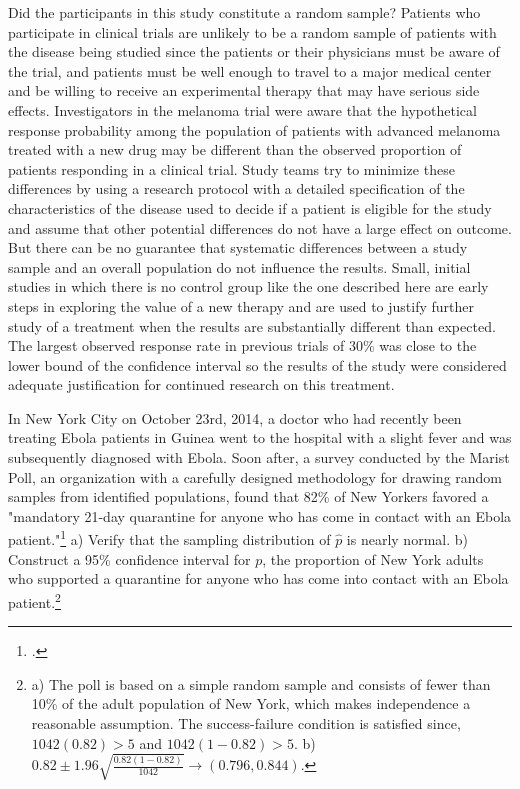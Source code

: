 Did the participants in this study constitute a random sample?  Patients who participate in clinical trials are unlikely to be a random sample of patients with the disease being studied since the patients or their physicians must be aware of the trial, and patients must be well enough to travel to a major medical center and be willing to receive an experimental therapy that may have serious side effects.  Investigators in the melanoma trial were aware that the hypothetical response probability among the population of patients with advanced melanoma treated with a new drug may be different than the observed proportion of patients responding in a clinical trial.  Study teams try to minimize these differences by using a research protocol with a detailed specification of the characteristics of the disease used to decide if a patient is eligible for the study and assume that other potential differences do not have a large effect on outcome.  But there can be no guarantee that systematic differences between a study sample and an overall population do not influence the results.  Small, initial studies in which there is no control group like the one described here are early steps in exploring the value of a new therapy and are used to justify further study of a treatment when the results are substantially different than expected.  The largest observed response rate in previous trials of 30\% was close to the lower bound of the confidence interval so the results of the study were considered adequate justification for continued research on this treatment.


\begin{exercise}
In New York City on October 23rd, 2014, a doctor who had recently been treating Ebola patients in Guinea went to the hospital with a slight fever and was subsequently diagnosed with Ebola. Soon after, a survey conducted by the Marist Poll, an organization with a carefully designed methodology for drawing random samples from identified populations, found that 82\% of New Yorkers favored a "mandatory 21-day quarantine for anyone who has come in contact with an Ebola patient."\footnote{.} a) Verify that the sampling distribution of $\hat{p}$ is nearly normal. b) Construct a 95\% confidence interval for $p$, the proportion of New York adults who supported a quarantine for anyone who has come into contact with an Ebola patient.\footnote{a) The poll is based on a simple random sample and consists of fewer than 10\% of the adult population of New York, which makes independence a reasonable assumption. The success-failure condition is satisfied since, $1042(0.82) > 5$ and $1042(1-0.82) > 5$. b) $0.82 \pm 1.96\sqrt{\frac{0.82(1-0.82)}{1042}} \rightarrow (0.796, 0.844)$. }
\end{exercise}


